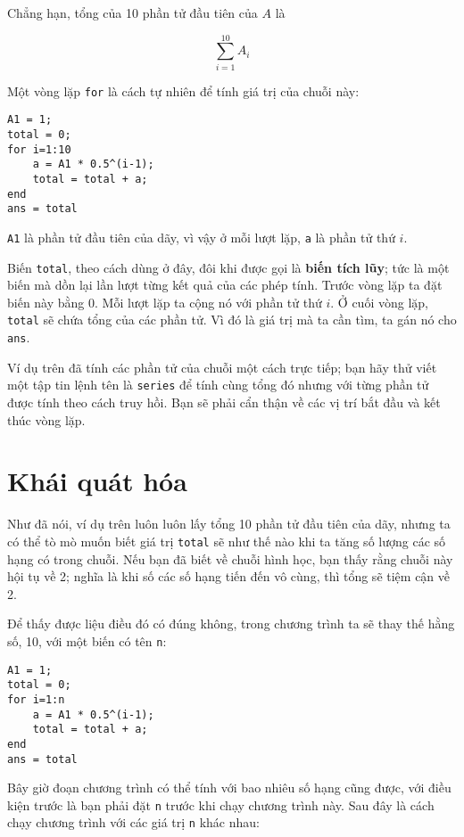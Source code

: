 \documentclass[12pt]{book}
\begin{document}
Chẳng hạn, tổng của 10 phần tử đầu tiên của $A$ là

\[ \sum_{i=1}^{10} A_i \]

Một vòng lặp {\tt for} là cách tự nhiên để tính giá trị của
chuỗi này:

\begin{verbatim}
A1 = 1;
total = 0;
for i=1:10
    a = A1 * 0.5^(i-1);
    total = total + a;
end
ans = total
\end{verbatim}

{\tt A1} là phần tử đầu tiên của dãy, vì vậy ở mỗi lượt lặp, 
{\tt a} là phần tử thứ $i$.

Biến {\tt total}, theo cách dùng ở đây, đôi khi được gọi là 
{\bf biến tích lũy}; tức là một biến mà dồn lại lần lượt từng kết quả 
của các phép tính. Trước vòng lặp ta đặt biến này bằng 0.  Mỗi
lượt lặp ta cộng nó với phần tử thứ $i$. Ở cuối vòng lặp, 
{\tt total} sẽ chứa tổng của các phần tử. Vì đó là giá trị mà
ta cần tìm, ta gán nó cho {\tt ans}.

\begin{ex}
Ví dụ trên đã tính các phần tử của chuỗi một cách trực tiếp;
bạn hãy thử viết một tập tin lệnh tên là {\tt series} để tính
cùng tổng đó nhưng với từng phần tử được tính theo cách
truy hồi. Bạn sẽ phải cẩn thận về các vị trí bắt đầu và kết thúc
vòng lặp.
\end{ex}


\section{Khái quát hóa}

Như đã nói, ví dụ trên luôn luôn lấy tổng 10 phần tử đầu tiên
của dãy, nhưng ta có thể tò mò muốn biết giá trị {\tt total}
sẽ như thế nào khi ta tăng số lượng các số hạng có trong chuỗi.
Nếu bạn đã biết về chuỗi hình học, bạn thấy rằng chuỗi này
hội tụ về 2; nghĩa là khi số các số hạng tiến đến vô cùng, thì
tổng sẽ tiệm cận về 2.

Để thấy được liệu điều đó có đúng không, trong chương trình
ta sẽ thay thế hằng số, 10, với một biến có tên {\tt n}:

\begin{verbatim}
A1 = 1;
total = 0;
for i=1:n
    a = A1 * 0.5^(i-1);
    total = total + a;
end
ans = total
\end{verbatim}

Bây giờ đoạn chương trình có thể tính với bao nhiêu số hạng
cũng được, với điều kiện trước là bạn phải đặt {\tt n} trước khi
chạy chương trình này. Sau đây là cách chạy chương trình
với các giá trị {\tt n} khác nhau:
\end{document}
